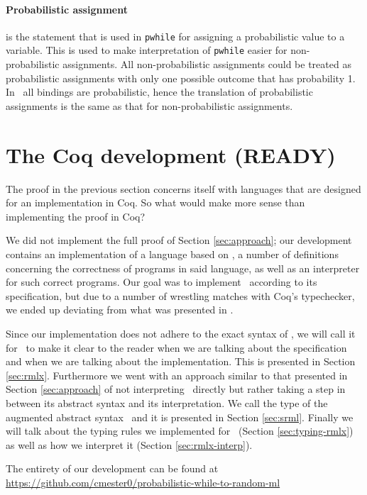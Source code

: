\documentclass[11pt, leqno, titlepage]{article}
\theoremstyle{definition}
\begin{document}
\paragraph{Probabilistic assignment} is the statement that is used in \texttt{pwhile}
for assigning a probabilistic value to a variable. This is used to make
interpretation of \texttt{pwhile} easier for non-probabilistic assignments. All
non-probabilistic assignments could be treated as probabilistic assignments with
only one possible outcome that has probability 1. In \rml\ all bindings are
probabilistic, hence the translation of probabilistic assignments is the same as that
for non-probabilistic assignments. 

\section{The Coq development (READY)}\label{sec:contrib}
The proof in the previous section concerns itself with languages that are designed
for an implementation in Coq. So what would make more sense than implementing the
proof in Coq?

We did not implement the full proof of Section \ref{sec:approach}; our development
contains an implementation of a language based on \rml, a number of definitions
concerning the correctness of programs in said language, as well as an interpreter
for such correct programs. Our goal was to implement \rml\ according to its
specification, but due to a number of wrestling matches with Coq's typechecker, we
ended up deviating from what was presented in \cite{rml-paper}.

Since our implementation does not adhere to the exact syntax of \rml, we will call it
for \rmlx\ to make it clear to the reader when we are talking about the specification
and when we are talking about the implementation. This is presented in Section
\ref{sec:rmlx}. Furthermore we went with an approach similar to that presented in
Section \ref{sec:approach} of not interpreting \rmlx\ directly but rather taking a
step in between its abstract syntax and its interpretation. We call the type of the
augmented abstract syntax \srml\ and it is presented in Section \ref{sec:srml}.
Finally we will talk about the typing rules we implemented for \rmlx\ (Section
\ref{sec:typing-rmlx}) as well as how we interpret it (Section
\ref{sec:rmlx-interp}). 

The entirety of our development can be found at \url{https://github.com/cmester0/probabilistic-while-to-random-ml}
\end{document}
